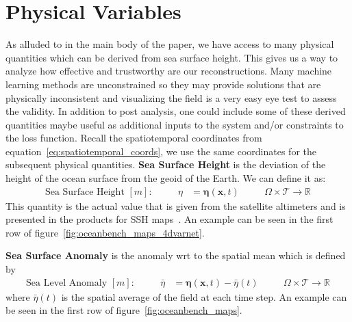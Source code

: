 \section{Physical Variables} \label{sec:physical_variables}

As alluded to in the main body of the paper, we have access to many physical quantities which can be derived from  sea surface height. 
This gives us a way to analyze how effective and trustworthy are our reconstructions. 
Many machine learning methods are unconstrained so they may provide solutions that are physically inconsistent and visualizing the field is a very easy eye test to assess the validity. 
In addition to post analysis, one could include some of these derived quantities maybe useful as additional inputs to the system and/or constraints to the loss function. 
Recall the spatiotemporal coordinates from equation~\ref{eq:spatiotemporal_coords}, 
we use the same coordinates for the subsequent physical quantities. \textbf{Sea Surface Height} is the deviation of the height of the ocean surface from the geoid of the Earth. We can define it as:
\begin{align}
	\text{Sea Surface Height }[m]:&& \quad
 \eta &= \boldsymbol{\eta}(\mathbf{x},t)&& \quad \Omega\times \mathcal{T}\rightarrow\mathbb{R} \label{eq:ssh}
\end{align}
This quantity is the actual value that is given from the satellite altimeters and is presented in the products for SSH maps~\cite{DUACS}. An example can be seen in the first row of figure~\ref{fig:oceanbench_maps_4dvarnet}.

\textbf{Sea Surface Anomaly} is the anomaly wrt to the spatial mean which is defined by
\begin{align}
	\text{Sea Level Anomaly }[m]:&& \quad
 \bar{\eta} &= \boldsymbol{\eta}(\mathbf{x},t) - \bar{\eta}(t) &&
 \quad \Omega\times \mathcal{T}\rightarrow\mathbb{R} \label{eq:sla}
\end{align}
where $\bar{\eta}(t)$ is the spatial average of the field at each time step.  
An example can be seen in the first row of figure~\ref{fig:oceanbench_maps}.

